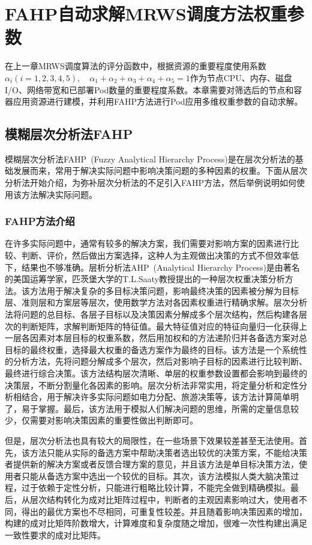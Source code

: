 \chapter{FAHP自动求解MRWS调度方法权重参数}
在上一章MRWS调度算法的评分函数中，根据资源的重要程度使用系数$\alpha_{i}(i=1,2,3,4,5), \quad\alpha_{1}+\alpha_{2}+\alpha_{3}+\alpha_{4}+\alpha_{5}=1$作为节点CPU、内存、磁盘I/O、网络带宽和已部署Pod数量的重要程度系数。本章需要对筛选后的节点和容器应用资源进行建模，并利用FAHP方法进行Pod应用多维权重参数的自动求解。

\section{模糊层次分析法FAHP}
模糊层次分析法FAHP~\cite{Kwong2002A,Hong2013Cloud}(Fuzzy Analytical Hierarchy Process)是在层次分析法的基础发展而来，常用于解决实际问题中影响决策问题的多种因素的权重。下面从层次分析法开始介绍，为弥补层次分析法的不足引入FAHP方法，然后举例说明如何使用该方法解决实际问题。

\subsection{FAHP方法介绍}
在许多实际问题中，通常有较多的解决方案，我们需要对影响方案的因素进行比较、判断、评价，然后做出方案选择，这种人为主观做出决策的方式不但效率低下，结果也不够准确。层析分析法AHP~\cite{Saaty1994How,Deng2012}(Analytical Hierarchy Process)是由著名的美国运筹学家，匹茨堡大学的T.L.Saaty教授提出的一种层次权重决策分析方法。该方法用于解决复杂的多目标决策问题，影响最终决策的因素被分解为目标层、准则层和方案层等层次，使用数学方法对各因素权重进行精确求解。层次分析法将问题的总目标、各层子目标以及决策因素分解成多个层次结构，然后构建各层次的判断矩阵，求解判断矩阵的特征值。最大特征值对应的特征向量归一化获得上一层各因素对本层目标的权重系数，然后用加权和的方法递阶归并各备选方案对总目标的最终权重，选择最大权重的备选方案作为最终的目标。该方法是一个系统性的分析方法，先将问题分解成多个层次，然后对影响子目标的因素进行比较判断、最终进行综合决策。该方法结构层次清晰、单层的权重参数设置都会影响到最终的决策层，不断分割量化各因素的影响。层次分析法非常实用，将定量分析和定性分析相结合，用于解决许多实际问题如电力分配、旅游决策等，该方法计算简单明了，易于掌握。最后，该方法用于模拟人们解决问题的思维，所需的定量信息较少，仅需要对影响决策因素的重要性做出判断即可。

但是，层次分析法也具有较大的局限性，在一些场景下效果较差甚至无法使用。首先，该方法只能从实际的备选方案中帮助决策者选出较优的决策方案，不能给决策者提供新的解决方案或者反馈合理方案的意见，并且该方法是单目标决策方法，使用者只能从备选方案中选出一个较优的目标。其次，该方法模拟人类大脑决策过程，过于依赖于定性分析，只能进行粗略比较计算，不能完全做到精确模拟。最后，从层次结构转化为成对比矩阵过程中，判断者的主观因素影响过大，使用者不同，得出的最优方案也不尽相同，可重复性较差。并且随着影响决策因素的增加，构建的成对比矩阵阶数增大，计算难度和复杂度随之增加，很难一次性构建出满足一致性要求的成对比矩阵。


